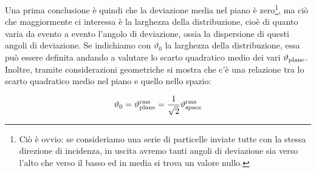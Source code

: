 Una prima conclusione è quindi che la deviazione media nel piano è zero\footnote{Ciò è ovvio: se consideriamo una serie di particelle inviate tutte con la stessa direzione di incidenza, in uscita avremo tanti angoli di deviazione sia verso l'alto che verso il basso ed in media si trova un valore nullo.}, ma ciò che maggiormente ci interessa è la larghezza della distribuzione, cioè di quanto varia da evento a evento l'angolo di deviazione, ossia la dispersione di questi angoli di deviazione. Se indichiamo con $\vartheta_0$ la larghezza della distribuzione, essa può essere definita andando a valutare lo scarto quadratico medio dei vari $\vartheta_{\rm plane}$. Inoltre, tramite considerazioni geometriche si mostra che c'è una relazione tra lo scarto quadratico medio nel piano e quello nello spazio:

\begin{equation*}
    \vartheta_0=\vartheta_{\rm plane}^{\rm rms}
    =\frac{1}{\sqrt{2}} \vartheta_{\rm space}^{\rm rms}
\end{equation*}


